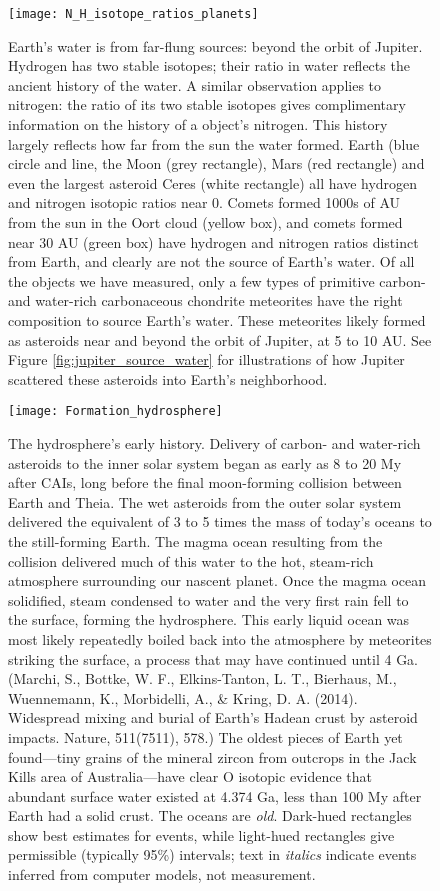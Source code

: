 \documentclass[amstex,12pt]{book}
\begin{document}
{\newpage
\begin{figure}[p]
\centering
  \texttt{[image: N\_H\_isotope\_ratios\_planets]}%
\caption{Earth's water is from far-flung sources: beyond the orbit of Jupiter. Hydrogen has two stable isotopes; their ratio in water reflects the ancient history of the water. A similar observation applies to nitrogen: the ratio of its two stable isotopes gives complimentary information on the history of a object's nitrogen. This history largely reflects how far from the sun the water formed. Earth (blue circle and line, the Moon (grey rectangle), Mars (red rectangle) and even the largest asteroid Ceres (white rectangle) all have hydrogen and nitrogen isotopic ratios near 0. Comets formed 1000s of AU from the sun in the Oort cloud (yellow box), and comets formed near 30 AU (green box) have hydrogen and nitrogen ratios distinct from Earth, and clearly are not the source of Earth's water. Of all the objects we have measured, only a few types of primitive carbon- and water-rich carbonaceous chondrite meteorites have the right composition to source Earth's water. These meteorites likely formed as asteroids near and beyond the orbit of Jupiter, at 5 to 10 AU. See Figure \ref{fig:jupiter_source_water} for illustrations of how Jupiter scattered these asteroids into Earth's neighborhood.} 
\label{fig:N_h_isotopes}
\end{figure}

\newpage
\begin{figure}
\centering
\texttt{[image: Formation\_hydrosphere]}%
\caption{The hydrosphere's early history. Delivery of carbon- and water-rich asteroids to the inner solar system began as early as 8 to 20 My after CAIs, long before the final moon-forming collision between Earth and Theia. The wet asteroids from the outer solar system delivered the equivalent of 3 to 5 times the mass of today's oceans to the still-forming Earth. The magma ocean resulting from the collision delivered much of this water to the hot, steam-rich atmosphere surrounding our nascent planet. Once the magma ocean solidified, steam condensed to water and the very first rain fell to the surface, forming the hydrosphere. This early liquid ocean was most likely repeatedly boiled back into the atmosphere by meteorites striking the surface, a process that may have continued until 4 Ga.(Marchi, S., Bottke, W. F., Elkins-Tanton, L. T., Bierhaus, M., Wuennemann, K., Morbidelli, A., \& Kring, D. A. (2014). Widespread mixing and burial of Earth’s Hadean crust by asteroid impacts. Nature, 511(7511), 578.) The oldest pieces of Earth yet found---tiny grains of the mineral zircon from outcrops in the Jack Kills area of Australia---have clear O isotopic evidence that abundant surface water existed at 4.374 Ga, less than 100 My after Earth had a solid crust. The oceans are \emph{old}. Dark-hued rectangles show best estimates for events, while light-hued rectangles give permissible (typically 95\%) intervals; text in \textit{italics} indicate events inferred from computer models, not measurement.}   
\label{fig:water_timing}
\end{figure}


}
\end{document}
